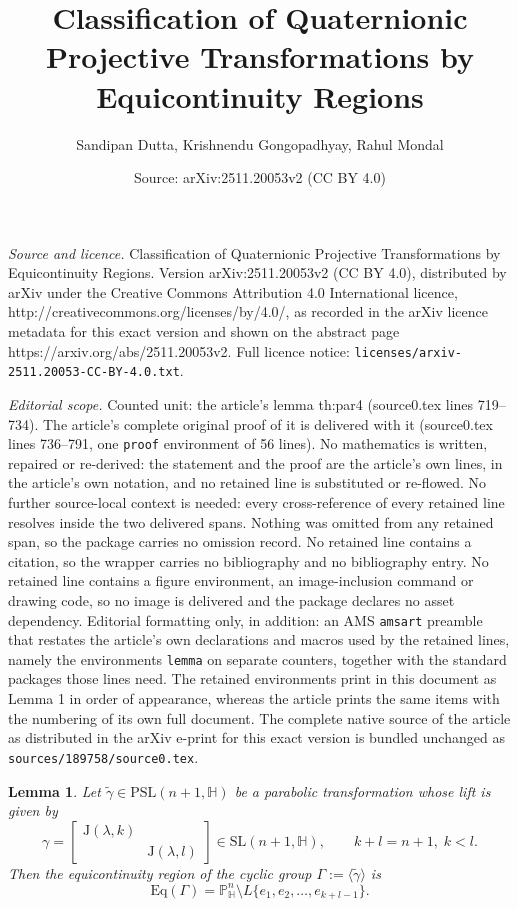 \documentclass[10pt,a4paper]{amsart}
\title{Classification of Quaternionic Projective Transformations by Equicontinuity Regions}
\author{Sandipan Dutta, Krishnendu Gongopadhyay, Rahul Mondal}
\date{Source: arXiv:2511.20053v2 (CC BY 4.0)}
\newtheorem{lemma}{Lemma}
\def\H{\mathbb H}
\def\P{\mathbb P}
\begin{document}
\maketitle

\noindent\emph{Source and licence.} Classification of Quaternionic Projective Transformations by Equicontinuity Regions. Version arXiv:2511.20053v2 (CC BY 4.0), distributed by arXiv under the Creative Commons Attribution 4.0 International licence, http://creativecommons.org/licenses/by/4.0/, as recorded in the arXiv licence metadata for this exact version and shown on the abstract page https://arxiv.org/abs/2511.20053v2. Full licence notice: \texttt{licenses/arxiv-2511.20053-CC-BY-4.0.txt}.\par\smallskip

\noindent\textit{Editorial scope.} Counted unit: the article's lemma th:par4 (source0.tex lines 719--734). The article's complete original proof of it is delivered with it (source0.tex lines 736--791, one \texttt{proof} environment of 56 lines). No mathematics is written, repaired or re-derived: the statement and the proof are the article's own lines, in the article's own notation, and no retained line is substituted or re-flowed.  No further source-local context is needed: every cross-reference of every retained line resolves inside the two delivered spans.  Nothing was omitted from any retained span, so the package carries no omission record.  No retained line contains a citation, so the wrapper carries no bibliography and no bibliography entry.  No retained line contains a figure environment, an image-inclusion command or drawing code, so no image is delivered and the package declares no asset dependency.  Editorial formatting only, in addition: an AMS \texttt{amsart} preamble that restates the article's own declarations and macros used by the retained lines, namely the environments \texttt{lemma} on separate counters, together with the standard packages those lines need.  The retained environments print in this document as Lemma 1 in order of appearance, whereas the article prints the same items with the numbering of its own full document.  The complete native source of the article as distributed in the arXiv e-print for this exact version is bundled unchanged as \texttt{sources/189758/source0.tex}.
\begin{lemma}
\label{th:par4}
Let $\tilde{\gamma} \in \mathrm{PSL}(n+1, \mathbb{H})$ be a parabolic transformation whose lift is given by 
\[
\gamma =
\begin{bmatrix}
    \mathrm{J}(\lambda, k) & \\
    & \mathrm{J}(\lambda, l)
\end{bmatrix}
\in \mathrm{SL}(n+1, \mathbb{H}), \qquad k + l = n + 1, \; k < l.
\]
Then the equicontinuity region of the cyclic group $\Gamma := \langle \tilde{\gamma} \rangle$ is 
\[
\mathrm{Eq}(\Gamma) = \P^n_\H\setminus L\{ e_1, e_2, \ldots, e_{k+l-1} \}.
\]
\end{lemma}
\end{document}
